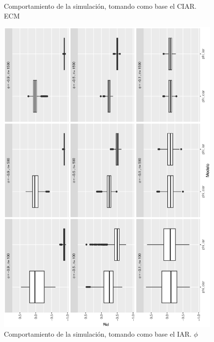 \begin{figure}[h]
\begin{minipage}{0.45\textwidth}
    \caption{Comportamiento de la simulación, tomando como base el CIAR. ECM}
    \label{fig:ciarvsiar}
    \end{minipage}
\end{figure}

\begin{figure}[h]
    \begin{minipage}{0.45\textwidth}
    \includegraphics[width=0.75\linewidth,angle = 270]{Kap3/Fig_Cap3/sim4_IARvsCIARphi.eps}
    \caption{Comportamiento de la simulación, tomando como base el IAR. $\phi$}
    \label{fig:iarvsciarphi}
    \end{minipage}
    \hfill
    \begin{minipage}{0.45\textwidth}

\end{minipage}
\end{figure}
